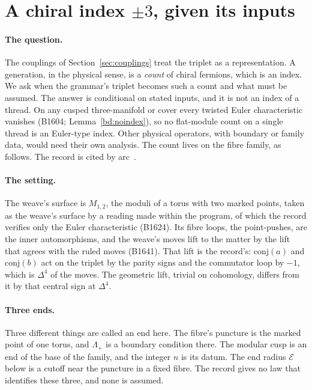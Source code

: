 \section{A chiral index $\pm3$, given its inputs}\label{sec:three}

\paragraph{The question.}
The couplings of Section~\ref{sec:couplings} treat the triplet as a representation. A generation, in the physical
sense, is a \emph{count} of chiral fermions, which is an index. We ask when the grammar's triplet becomes such a count
and what must be assumed. The answer is conditional on stated inputs, and it is not an index of a thread. On any cusped
three-manifold or cover every twisted Euler characteristic vanishes (B1604; Lemma~\ref{bd:noindex}), so no flat-module count on a single thread is an Euler-type index. Other physical operators, with boundary or family data, would need their own analysis. The count lives on the fibre
family, as follows. The record is cited by arc~\cite{OriginAxiomRepo}.

\paragraph{The setting.}
The weave's surface is $M_{1,2}$, the moduli of a torus with two marked points, taken as the weave's surface by a reading made
within the program, of which the record verifies only the Euler characteristic (B1624). Its fibre loops, the point-pushes, are the inner automorphisms,
and the weave's moves lift to the matter by the lift that agrees with the ruled moves (B1641). That lift is the record's:
$\mathrm{conj}(a)$ and $\mathrm{conj}(b)$ act on the triplet by the parity signs and the commutator loop by $-1$, which is
$\Delta^4$ of the moves. The geometric lift, trivial on cohomology, differs from it by that central sign at $\Delta^4$.

\paragraph{Three ends.} Three different things are called an end here. The fibre's puncture is the marked point of one torus, and $\Lambda_+$ is a boundary condition there. The modular cusp is an end of the base of the family, and the integer $n$ is its datum. The end radius $\mathcal E$ below is a cutoff near the puncture in a fixed fibre. The record gives no law that identifies these three, and none is assumed.

